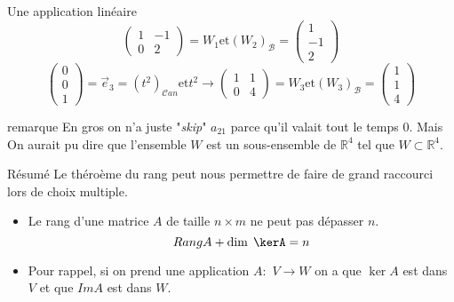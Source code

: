 \begin{parag}{Une application linéaire}
\[\begin{pmatrix}
         1 & -1 \\ 0 & 2
     \end{pmatrix} = W_1 \text{et} \left(W_2\right)_{\mathcal{B}} = \begin{pmatrix}
         1 \\ -1 \\ 2
     \end{pmatrix}\]
     \[\begin{pmatrix}
         0 \\ 0 \\ 1
     \end{pmatrix} = \vec{e}_3 = \left(t^2\right)_{\mathcal{C}an} \text{et} t^2 \to \begin{pmatrix}
         1 & 1 \\ 0 & 4
     \end{pmatrix} = W_3 \text{et} \left(W_3\right)_{\mathcal{B}} = \begin{pmatrix}
         1 \\ 1 \\ 4
     \end{pmatrix}\]
     \begin{subparag}{remarque}
         En gros on n'a juste "\textit{skip}" $a_{21}$ parce qu'il valait tout le temps $0$. Mais On aurait pu dire que l'ensemble $W$ est un sous-ensemble de $\mathbb{R}^4$ tel que $W \subset \mathbb{R}^4$.
     \end{subparag}
 \end{parag}

 \begin{parag}{Résumé}
     Le théroème du rang peut nous permettre de faire de grand raccourci lors de choix multiple.
     \begin{itemize}
         \item Le rang d'une matrice $A$ de taille $n \times m$ ne peut pas dépasser $n$.
         \[Rang  A + \dim\; \kerA = n\]
         \item Pour rappel, si on prend une application $A :$ $V \to W$ on a que $\ker A$ est dans $V$ et que $Im A$ est dans $W$.                               
     \end{itemize}
 \end{parag}
